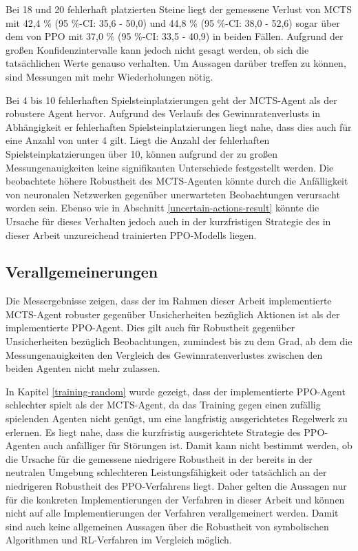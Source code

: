 Bei 18 und 20 fehlerhaft platzierten Steine liegt der gemessene Verlust von MCTS mit 42,4 \% (95 \%-CI: 35,6 - 50,0) und 44,8 \% (95 \%-CI: 38,0 - 52,6) sogar über dem von PPO mit 37,0 \% (95 \%-CI: 33,5 - 40,9) in beiden Fällen. Aufgrund der großen Konfidenzintervalle kann jedoch nicht gesagt werden, ob sich die tatsächlichen Werte genauso verhalten. Um Aussagen darüber treffen zu können, sind Messungen mit mehr Wiederholungen nötig.

Bei 4 bis 10 fehlerhaften Spielsteinplatzierungen geht der MCTS-Agent als der robustere Agent hervor. Aufgrund des Verlaufs des Gewinnratenverlusts in Abhängigkeit er fehlerhaften Spielsteinplatzierungen liegt nahe, dass dies auch für eine Anzahl von unter 4 gilt. Liegt die Anzahl der fehlerhaften Spielsteinpkatzierungen über 10, können aufgrund der zu großen Messungenauigkeiten keine signifikanten Unterschiede festgestellt werden. Die beobachtete höhere Robustheit des MCTS-Agenten könnte durch die Anfälligkeit von neuronalen Netzwerken gegenüber unerwarteten Beobachtungen verursacht worden sein. Ebenso wie in Abschnitt \ref{uncertain-actions-result} könnte die Ursache für dieses Verhalten jedoch auch in der kurzfristigen Strategie des in dieser Arbeit unzureichend trainierten PPO-Modells liegen.

\subsection{Verallgemeinerungen}

Die Messergebnisse zeigen, dass der im Rahmen dieser Arbeit implementierte MCTS-Agent robuster gegenüber Unsicherheiten bezüglich Aktionen ist als der implementierte PPO-Agent. Dies gilt auch für Robustheit gegenüber Unsicherheiten bezüglich Beobachtungen, zumindest bis zu dem Grad, ab dem die Messungenauigkeiten den Vergleich des Gewinnratenverlustes zwischen den beiden Agenten nicht mehr zulassen.

In Kapitel \ref{training-random} wurde gezeigt, dass der implementierte PPO-Agent schlechter spielt als der MCTS-Agent, da das Training gegen einen zufällig spielenden Agenten nicht genügt, um eine langfristig ausgerichtetes Regelwerk zu erlernen. Es liegt nahe, dass die kurzfristig ausgerichtete Strategie des PPO-Agenten auch anfälliger für Störungen ist. Damit kann nicht bestimmt werden, ob die Ursache für die gemessene niedrigere Robustheit in der bereits in der neutralen Umgebung schlechteren Leistungsfähigkeit oder tatsächlich an der niedrigeren Robustheit des PPO-Verfahrens liegt. Daher gelten die Aussagen nur für die konkreten Implementierungen der Verfahren in dieser Arbeit und können nicht auf alle Implementierungen der Verfahren verallgemeinert werden. Damit sind auch keine allgemeinen Aussagen über die Robustheit von symbolischen Algorithmen und RL-Verfahren im Vergleich möglich.

